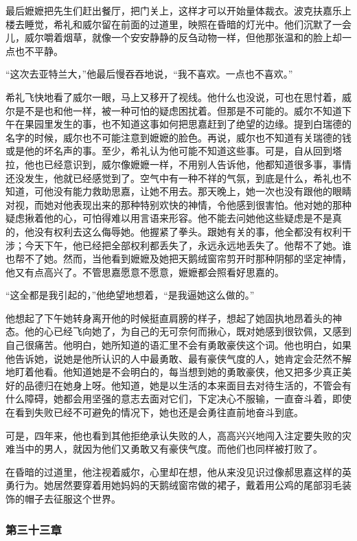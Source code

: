 \par 最后嬷嬷把先生们赶出餐厅，把门关上，这样才可以开始量体裁衣。波克扶嘉乐上楼去睡觉，希礼和威尔留在前面的过道里，映照在昏暗的灯光中。他们沉默了一会儿，威尔嚼着烟草，就像一个安安静静的反刍动物一样，但他那张温和的脸上却一点也不平静。
\par “这次去亚特兰大，”他最后慢吞吞地说，“我不喜欢。一点也不喜欢。”
\par 希礼飞快地看了威尔一眼，马上又移开了视线。他什么也没说，可也在思忖着，威尔是不是也和他一样，被一种可怕的疑虑困扰着。但那是不可能的。威尔不知道下午在果园里发生的事，也不知道这事如何把思嘉赶到了绝望的边缘。提到白瑞德的名字的时候，威尔也不可能注意到嬷嬷的脸色。再说，威尔也不知道有关瑞德的钱或是他的坏名声的事。至少，希礼认为他可能不知道这些事。可是，自从回到塔拉，他也已经意识到，威尔像嬷嬷一样，不用别人告诉他，他都知道很多事，事情还没发生，他就已经感觉到了。空气中有一种不祥的气氛，到底是什么，希礼也不知道，可他没有能力救助思嘉，让她不用去。那天晚上，她一次也没有跟他的眼睛对视，而她对他表现出来的那种特别欢快的神情，令他感到很害怕。他对她的那种疑虑揪着他的心，可怕得难以用言语来形容。他不能去问她他这些疑虑是不是真的，他没有权利去这么侮辱她。他握紧了拳头。跟她有关的事，他全都没有权利干涉；今天下午，他已经把全部权利都丢失了，永远永远地丢失了。他帮不了她。谁也帮不了她。然而，当他看到嬷嬷及她把天鹅绒窗帘剪开时那种阴郁的坚定神情，他又有点高兴了。不管思嘉愿意不愿意，嬷嬷都会照看好思嘉的。
\par “这全都是我引起的，”他绝望地想着，“是我逼她这么做的。”
\par 他想起了下午她转身离开他的时候挺直肩膀的样子，想起了她固执地昂着头的神态。他的心已经飞向她了，为自己的无可奈何而揪心，既对她感到很钦佩，又感到自己很痛苦。他明白，她所知道的语汇里不会有勇敢豪侠这个词。他也明白，如果他告诉她，说她是他所认识的人中最勇敢、最有豪侠气度的人，她肯定会茫然不解地盯着他看。他知道她是不会明白的，每当想到她的勇敢豪侠，他又把多少真正美好的品德归在她身上呀。他知道，她是以生活的本来面目去对待生活的，不管会有什么障碍，她都会用坚强的意志去面对它们，下定决心不服输，一直奋斗着，即使在看到失败已经不可避免的情况下，她也还是会勇往直前地奋斗到底。
\par 可是，四年来，他也看到其他拒绝承认失败的人，高高兴兴地闯入注定要失败的灾难当中的男人，就因为他们又勇敢又有豪侠气度。而他们也同样被打败了。
\par 在昏暗的过道里，他注视着威尔，心里却在想，他从来没见识过像郝思嘉这样的英勇行为。她居然要穿着用她妈妈的天鹅绒窗帘做的裙子，戴着用公鸡的尾部羽毛装饰的帽子去征服这个世界。

\subsubsection{第三十三章}

